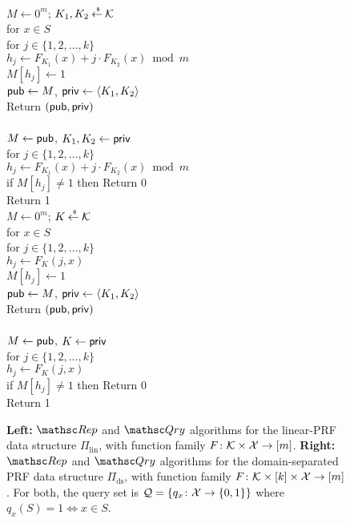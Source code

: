 \begin{figure}[htp]
\centering
{}
{
\\
$M \gets 0^m$; $K_1,K_2 {\:\stackrel{{\scriptscriptstyle \hspace{0.2em}\$}} {\leftarrow}\:} {\cal K}$\\
for $x \in S$\\
\nudge for $j \in \{1,2,\ldots,k\}$\\
\nudge\nudge $h_j \gets F_{K_1}(x) + j\cdot F_{K_2}(x) \bmod m$\\
\nudge\nudge $M[h_j] \gets 1$\\
${\sf pub} \gets M$, ${\sf priv} \gets \langle K_1, K_2 \rangle$\\
Return $({\sf pub},{\sf priv})$\\

\medskip
{}\\
$M\gets{\sf pub}$, $K_1,K_2 \gets {\sf priv}$\\
for $j \in \{1,2,\ldots,k\}$\\
\nudge $h_j \gets F_{K_1}(x) + j\cdot F_{K_2}(x) \bmod m$\\
\nudge if $M[h_j] \neq 1$ then Return 0\\
Return 1
}
{
\\
$M \gets 0^m$; $K {\:\stackrel{{\scriptscriptstyle \hspace{0.2em}\$}} {\leftarrow}\:} {\cal K}$\\
for $x \in S$\\
\nudge for $j \in \{1,2,\ldots,k\}$\\
\nudge\nudge $h_j \gets F_{K}(j,x) $\\
\nudge\nudge $M[h_j] \gets 1$\\
${\sf pub} \gets M$, ${\sf priv} \gets \langle K_1, K_2 \rangle$\\
Return $({\sf pub},{\sf priv})$\\

\medskip
{}\\
$M\gets{\sf pub}$, $K \gets {\sf priv}$\\
for $j \in \{1,2,\ldots,k\}$\\
\nudge $h_j \gets F_{K}(j,x) $\\
\nudge if $M[h_j] \neq 1$ then Return 0\\
Return 1
}
\caption{{\bf Left:} $\Rep$ and $\Qry$ algorithms for the linear-PRF
  data structure $\Pi_{\mathrm{lin}}$, with function family $F \colon
  {\cal K} \times {\cal X} \to [m]$. {\bf Right:} $\Rep$ and $\Qry$
  algorithms for the domain-separated PRF data structure
  $\Pi_{\mathrm{ds}}$, with function family $F \colon {\cal K} \times
  [k]\times{\cal X} \to [m]$.  For both, the query set is ${\cal Q}=\{q_x\colon
  {\cal X} \to \{0,1\}\}$ where $q_x(S)=1 \Leftrightarrow x \in S$.  }
\label{fig:lin-and-ds}
\end{figure}